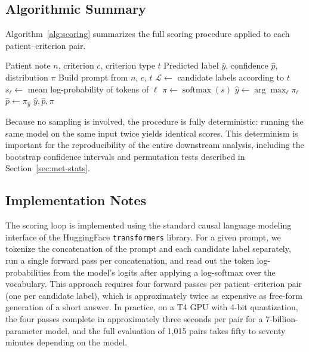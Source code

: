 \subsection{Algorithmic Summary}
\label{subsec:met-scoring-algorithm}

Algorithm~\ref{alg:scoring} summarizes the full scoring procedure applied 
to each patient--criterion pair.

\begin{algorithm}[htbp]
\caption{Log-probability scoring for eligibility label prediction}
\label{alg:scoring}
\begin{algorithmic}[1]
    \Require Patient note $n$, criterion $c$, criterion type $t$
    \Ensure Predicted label $\hat{y}$, confidence $\hat{p}$, distribution $\pi$
    \State Build prompt from $n$, $c$, $t$
    \State $\mathcal{L} \gets$ candidate labels according to $t$
        \State $s_\ell \gets $ mean log-probability of tokens of $\ell$
    \EndFor
    \State $\pi \gets \operatorname{softmax}(s)$
    \State $\hat{y} \gets \arg\max_{\ell} \pi_\ell$
    \State $\hat{p} \gets \pi_{\hat{y}}$
    \State \Return $\hat{y}, \hat{p}, \pi$
\end{algorithmic}
\end{algorithm}

Because no sampling is involved, the procedure is fully deterministic: 
running the same model on the same input twice yields identical scores. 
This determinism is important for the reproducibility of the entire 
downstream analysis, including the bootstrap confidence intervals and 
permutation tests described in Section~\ref{sec:met-stats}.

\subsection{Implementation Notes}
\label{subsec:met-scoring-implementation}

The scoring loop is implemented using the standard causal language modeling 
interface of the HuggingFace \texttt{transformers} library. For a given 
prompt, we tokenize the concatenation of the prompt and each candidate 
label separately, run a single forward pass per concatenation, and read 
out the token log-probabilities from the model's logits after applying a 
log-softmax over the vocabulary. This approach requires four forward 
passes per patient--criterion pair (one per candidate label), which is 
approximately twice as expensive as free-form generation of a short 
answer. In practice, on a T4 GPU with 4-bit quantization, the four passes 
complete in approximately three seconds per pair for a 7-billion-parameter 
model, and the full evaluation of 1{,}015 pairs takes fifty to seventy 
minutes depending on the model.

